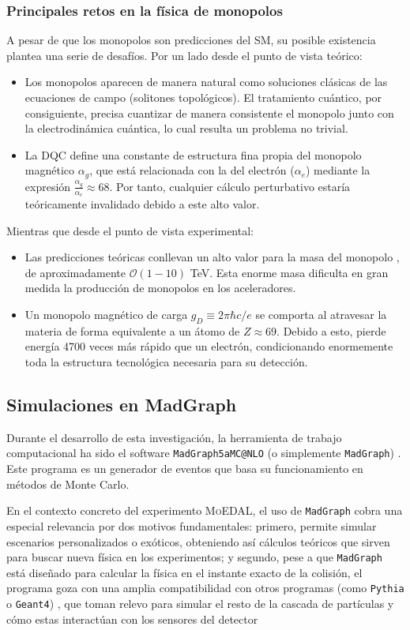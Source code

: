 \documentclass[12pt, a4paper]{article}
\begin{document}
\subsubsection{Principales retos en la física de monopolos}
A pesar de que los monopolos son predicciones del SM, su posible existencia plantea una serie de desafíos. Por un lado desde el punto de vista teórico:
\begin{itemize}
    \item Los monopolos aparecen de manera natural como soluciones clásicas de las ecuaciones de campo (solitones topológicos). El tratamiento cuántico, por consiguiente, precisa cuantizar de manera consistente el monopolo junto con la electrodinámica cuántica, lo cual resulta un problema no trivial.
    \item La DQC define una constante de estructura fina propia del monopolo magnético $\alpha_g$, que está relacionada con la del electrón ($\alpha_e$) mediante la expresión $\frac{\alpha_g}{\alpha_e}\approx 68$.
    Por tanto, cualquier cálculo perturbativo estaría teóricamente invalidado debido a este alto valor.
\end{itemize}
Mientras que desde el punto de vista experimental:
\begin{itemize}
    \item Las predicciones teóricas conllevan un alto valor para la masa del monopolo \cite{2016,MoEDAL2017,mitsou2026magneticmonopolesdirac}, de aproximadamente $\mathcal{O}(1-10)$ TeV. Esta enorme masa dificulta en gran medida la producción de monopolos en los aceleradores.
    \item Un monopolo magnético de carga $g_D \equiv 2\pi\hbar c/e$ se comporta al atravesar la materia de forma equivalente a un átomo de $Z \approx 69$. Debido a esto, pierde energía 4700 veces más rápido que un electrón, condicionando enormemente toda la estructura tecnológica necesaria para su detección.
\end{itemize}
\subsection{Simulaciones en MadGraph}

Durante el desarrollo de esta investigación, la herramienta de trabajo computacional ha sido el software \texttt{MadGraph5\textunderscore aMC@NLO} (o simplemente \texttt{MadGraph}) \cite{Alwall_2014}. Este programa es un generador de eventos que basa su funcionamiento en métodos de Monte Carlo.

En el contexto concreto del experimento \textsc{MoEDAL}, el uso de \texttt{MadGraph} cobra una especial relevancia por dos motivos fundamentales: primero, permite simular escenarios personalizados o exóticos, obteniendo así cálculos teóricos que sirven para buscar nueva física en los experimentos; y segundo, pese a que \texttt{MadGraph} está diseñado para calcular la física en el instante exacto de la colisión, el programa goza con una amplia compatibilidad con otros programas (como \texttt{Pythia} o \texttt{Geant4}) , que toman relevo para simular el resto de la cascada de partículas  y cómo estas interactúan con los sensores del detector
\end{document}

